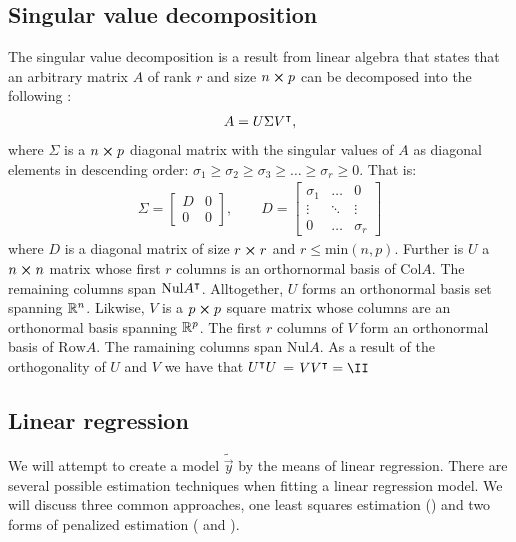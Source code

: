 \subsection{Singular value decomposition}\label{sec:SVD}
    The singular value decomposition is a result from linear algebra that states that an arbitrary matrix $A$ of rank $r$ and size $n\cross p$ can be decomposed into the following \citep{svdecomp}:
    \begin{align}\label{eq:svd}
        A = U\Sigma V\TT,
    \end{align}
    where $\Sigma$ is a $n\cross p$ diagonal matrix with the singular values of $A$ as diagonal elements in descending order: $\sigma_1\geq\sigma_2\geq\sigma_3\geq\dots\geq\sigma_r\geq 0$. That is:
    \begin{align*}
        \Sigma = 
        \begin{bmatrix}
            D & 0 \\
            0 & 0
        \end{bmatrix},
        \quad\quad D = 
        \begin{bmatrix}
            \sigma_1 & \dots & 0 \\
            \vdots & \ddots & \vdots \\
            0 & \dots & \sigma_r
        \end{bmatrix}
    \end{align*}
    where $D$ is a diagonal matrix of size $r\cross r$ and $r\leq \text{min}(n,p)$. Further is $U$ a $n\cross n$ matrix whose first $r$ columns is an orthornormal basis of $\text{Col}A$. The remaining columns span $\text{Nul}A\TT$. Alltogether, $U$ forms an orthonormal basis set spanning $\RR[n]$. Likwise, $V$ is a $p\cross p$ square matrix whose columns are an orthonormal basis spanning $\RR[p]$. The first $r$ columns of $V$ form an orthonormal basis of $\text{Row} A$. The ramaining columns span $\text{Nul}A$. As a result of the orthogonality of $U$ and $V$ we have that $U\TT U$ = $VV\TT = \II$

\subsection{Linear regression}\label{sec:regression}
We will attempt to create a model $\tilde{\vec{y}}$ by the means of linear regression. 
There are several possible estimation techniques when fitting a linear regression model. We will discuss three common approaches, one least squares estimation () and two forms of penalized estimation ( and ).


